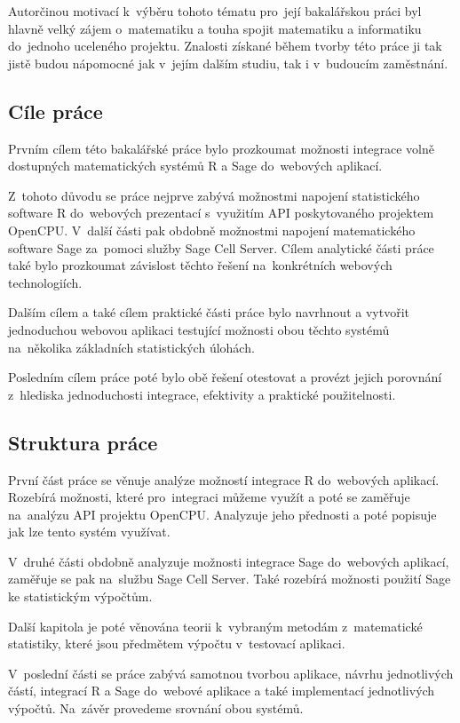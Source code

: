 \documentclass[thesis=B,czech]{FITthesis}[2012/06/26]
\begin{document}
\begin{introduction}
Autorčinou motivací k~výběru tohoto tématu pro~její bakalářskou práci byl hlavně velký zájem o~matematiku a touha spojit matematiku a informatiku do~jednoho uceleného projektu. Znalosti získané během tvorby této práce ji tak jistě budou nápomocné jak v~jejím dalším studiu, tak i v~budoucím zaměstnání.
	
\subsection{Cíle práce}



    Prvním cílem této bakalářské práce bylo prozkoumat možnosti integrace volně dostupných matematických systémů R a Sage do~webových aplikací.
    
    Z~tohoto důvodu se práce nejprve zabývá možnostmi napojení statistického software R do~webových prezentací s~využitím API poskytovaného projektem OpenCPU. V~další části pak obdobně možnostmi napojení matematického software Sage za~pomoci služby Sage Cell Server. Cílem analytické části práce také bylo prozkoumat závislost těchto řešení na~konkrétních webových technologiích.
    
    Dalším cílem a také cílem praktické části práce bylo navrhnout a vytvořit jednoduchou webovou aplikaci testující možnosti obou těchto systémů na~několika základních statistických úlohách.
    
    Posledním cílem práce poté bylo obě řešení otestovat a provézt jejich porovnání z~hlediska jednoduchosti integrace, efektivity a praktické použitelnosti.

\subsection{Struktura práce}
První část práce se věnuje analýze možností integrace R do~webových aplikací. Rozebírá možnosti, které pro~integraci můžeme využít a poté se zaměřuje na~analýzu API projektu OpenCPU. Analyzuje jeho přednosti a poté popisuje jak lze tento systém využívat.

V~druhé části obdobně analyzuje možnosti integrace Sage do~webových aplikací, zaměřuje se pak na~službu Sage Cell Server. Také rozebírá možnosti použití Sage ke statistickým výpočtům.

Další kapitola je poté věnována teorii k~vybraným metodám z~matematické statistiky, které jsou předmětem výpočtu v~testovací aplikaci.

V~poslední části se práce zabývá samotnou tvorbou aplikace, návrhu jednotlivých částí, integrací R a Sage do~webové aplikace a také implementací jednotlivých výpočtů. Na~závěr provedeme srovnání obou systémů.

\end{introduction}
\end{document}
